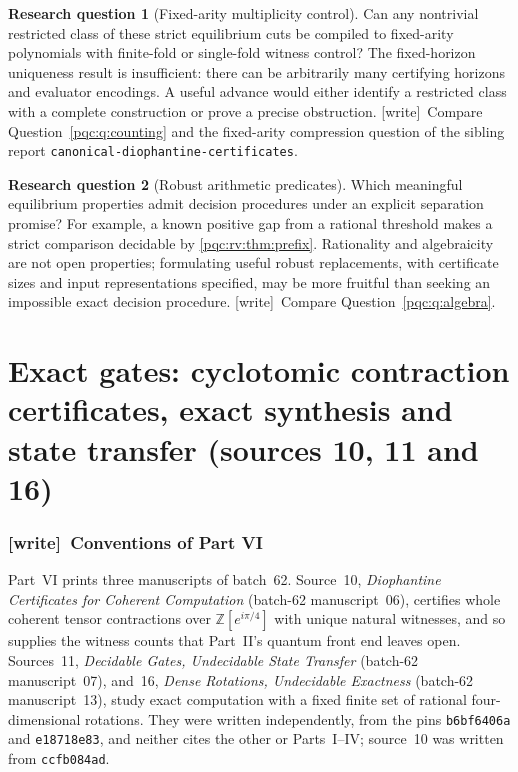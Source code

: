 \documentclass[11pt,letterpaper]{article}
\numberwithin{equation}{section}
\theoremstyle{definition}
\newtheorem{question}{Research question}
\theoremstyle{remark}
\newcommand{\Z}{\mathbb Z}
\newcommand{\code}[1]{\nolinkurl{#1}}
\newcommand{\wtag}{\textup{[write]}}
\begin{document}
\begin{question}[Fixed-arity multiplicity control]
Can any nontrivial restricted class of these strict equilibrium cuts
be compiled to fixed-arity polynomials with finite-fold or single-fold
witness control? The fixed-horizon uniqueness result is insufficient:
there can be arbitrarily many certifying horizons and evaluator
encodings. A useful advance would either identify a restricted class
with a complete construction or prove a precise obstruction.
\wtag\ Compare Question~\ref{pqc:q:counting} and the fixed-arity compression question of the sibling report \code{canonical-diophantine-certificates}.
\end{question}

\begin{question}[Robust arithmetic predicates]
Which meaningful equilibrium properties admit decision procedures
under an explicit separation promise? For example, a known positive
gap from a rational threshold makes a strict comparison decidable by
\cref{pqc:rv:thm:prefix}. Rationality and algebraicity are not open properties;
formulating useful robust replacements, with certificate sizes and
input representations specified, may be more fruitful than seeking
an impossible exact decision procedure.
\wtag\ Compare Question~\ref{pqc:q:algebra}.
\end{question}


\part{Exact gates: cyclotomic contraction certificates, exact synthesis and state transfer (sources 10, 11 and 16)}
\label{pqc:part:b62-VI}

\section{\wtag\ Conventions of Part VI}
\label{pqc:conv:b62-VI}

Part~VI prints three manuscripts of batch~62. Source~10, \emph{Diophantine
Certificates for Coherent Computation} (batch-62 manuscript~06), certifies whole
coherent tensor contractions over $\Z[e^{i\pi/4}]$ with unique natural
witnesses, and so supplies the witness counts that Part~II's quantum front end
leaves open. Sources~11, \emph{Decidable Gates, Undecidable State Transfer}
(batch-62 manuscript~07), and~16, \emph{Dense Rotations, Undecidable Exactness}
(batch-62 manuscript~13), study exact computation with a fixed finite set of
rational four-dimensional rotations. They were written independently, from the
pins \code{b6bf6406a} and \code{e18718e83}, and neither cites the other or
Parts~I--IV; source~10 was written from \code{ccfb084ad}.
\end{document}
